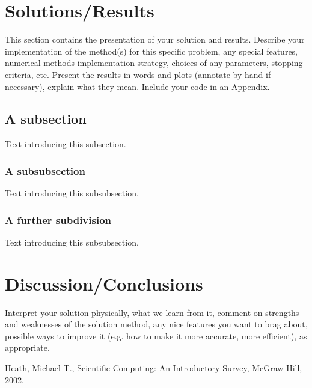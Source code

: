 \documentclass[11pt]{article}
\begin{document}
\section{Solutions/Results}\label{S:4}
This section contains the presentation of your solution and results.
Describe your implementation of the method(s) for this specific problem, any special features, numerical methods implementation  strategy, choices of any parameters, stopping criteria, etc.
Present the results in words and plots (annotate by hand if necessary), explain what they mean. Include your code in an Appendix. 

\subsection{A subsection}
%
Text introducing this subsection. 

\subsubsection{A subsubsection}
%
Text introducing this subsubsection. 

\subsubsection{A further subdivision}
%
Text introducing this subsubsection. 

\section{Discussion/Conclusions}\label{S:5}
Interpret your solution physically, what we learn from it, comment on strengths and weaknesses of the solution method, any nice features you want to brag about, possible ways to improve it (e.g. how to make it more accurate, more efficient), as appropriate.


\begin{thebibliography}{100}
Heath, Michael T., Scientific Computing: An Introductory Survey, McGraw Hill, 2002.
%
%

\end{thebibliography}
\end{document}
